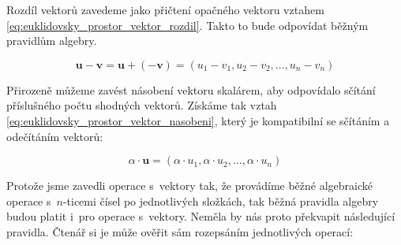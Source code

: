 \documentclass{book}
\newcommand{\vect}[1]{\boldsymbol{#1}}
\begin{document}
Rozdíl vektorů zavedeme jako přičtení opačného vektoru vztahem \eqref{eq:euklidovsky_prostor_vektor_rozdil}. Takto to bude odpovídat běžným pravidlům algebry.

\begin{equation}
\label{eq:euklidovsky_prostor_vektor_rozdil}
\vect{u} - \vect{v} = \vect{u} + (-\vect{v})= (u_1 - v_1, u_2 - v_2, ..., u_n - v_n)
\end{equation}

Přirozeně můžeme zavést násobení vektoru skalárem, aby odpovídalo sčítání příslušného počtu shodných vektorů. Získáme tak vztah \eqref{eq:euklidovsky_prostor_vektor_nasobeni}, který je kompatibilní se sčítáním a odečítáním vektorů:

\begin{equation}
\label{eq:euklidovsky_prostor_vektor_nasobeni}
\alpha \cdot \vect{u} = (\alpha \cdot u_1, \alpha \cdot u_2, ..., \alpha \cdot u_n)
\end{equation}


Protože jsme zavedli operace s~vektory tak, že provádíme běžné algebraické operace s~\(n\)-ticemi čísel po jednotlivých složkách, tak běžná pravidla algebry budou platit i~pro operace s~vektory. Neměla by nás proto překvapit následující pravidla. Čtenář si je může ověřit sám rozepsáním jednotlivých operací:
\end{document}
